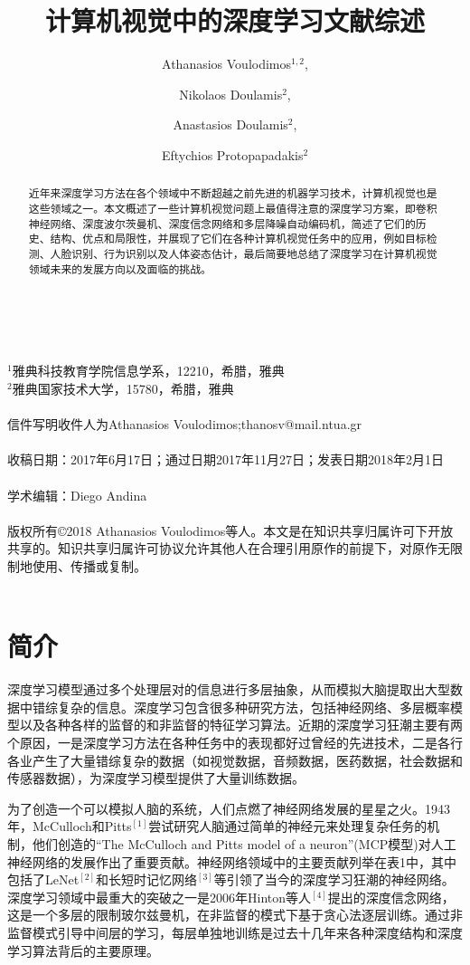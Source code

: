 \documentclass[a4paper]{article}
\title{计算机视觉中的深度学习文献综述}  %
\begin{document}
\maketitle %
\author{Athanasios Voulodimos$^{1,2}$,}
\author{Nikolaos Doulamis$^{2}$,}
\author{Anastasios Doulamis$^{2}$,}
\author{Eftychios Protopapadakis$^{2}$}\\\\
$^{1}$雅典科技教育学院信息学系，12210，希腊，雅典\\
$^{2}$雅典国家技术大学，15780，希腊，雅典\\\\
信件写明收件人为Athanasios Voulodimos;thanosv@mail.ntua.gr\\\\
收稿日期：2017年6月17日；通过日期2017年11月27日；发表日期2018年2月1日\\\\
学术编辑：Diego Andina\\\\
版权所有\copyright2018 Athanasios Voulodimos等人。本文是在知识共享归属许可下开放共享的。知识共享归属许可协议允许其他人在合理引用原作的前提下，对原作无限制地使用、传播或复制。\\\\

\begin{abstract}
	近年来深度学习方法在各个领域中不断超越之前先进的机器学习技术，计算机视觉也是这些领域之一。本文概述了一些计算机视觉问题上最值得注意的深度学习方案，即卷积神经网络、深度波尔茨曼机、深度信念网络和多层降噪自动编码机，简述了它们的历史、结构、优点和局限性，并展现了它们在各种计算机视觉任务中的应用，例如目标检测、人脸识别、行为识别以及人体姿态估计，最后简要地总结了深度学习在计算机视觉领域未来的发展方向以及面临的挑战。
\end{abstract}
\section{简介} %
深度学习模型通过多个处理层对的信息进行多层抽象，从而模拟大脑提取出大型数据中错综复杂的信息。深度学习包含很多种研究方法，包括神经网络、多层概率模型以及各种各样的监督的和非监督的特征学习算法。近期的深度学习狂潮主要有两个原因，一是深度学习方法在各种任务中的表现都好过曾经的先进技术，二是各行各业产生了大量错综复杂的数据（如视觉数据，音频数据，医药数据，社会数据和传感器数据），为深度学习模型提供了大量训练数据。


为了创造一个可以模拟人脑的系统，人们点燃了神经网络发展的星星之火。1943年，McCulloch和Pitts$^{[1]}$尝试研究人脑通过简单的神经元来处理复杂任务的机制，他们创造的“The McCulloch and Pitts model of a neuron”(MCP模型)对人工神经网络的发展作出了重要贡献。神经网络领域中的主要贡献列举在表1中，其中包括了LeNet$^{[2]}$和长短时记忆网络$^{[3]}$等引领了当今的深度学习狂潮的神经网络。深度学习领域中最重大的突破之一是2006年Hinton等人$^{[4]}$提出的深度信念网络，这是一个多层的限制玻尔兹曼机，在非监督的模式下基于贪心法逐层训练。通过非监督模式引导中间层的学习，每层单独地训练是过去十几年来各种深度结构和深度学习算法背后的主要原理。
\end{document}
